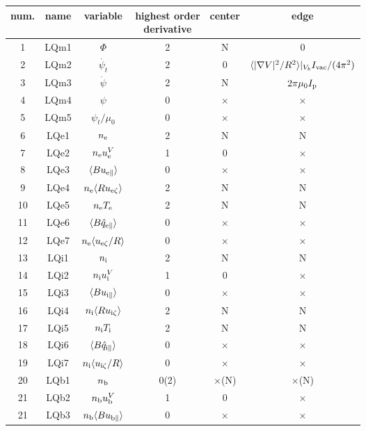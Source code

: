 \documentclass[11pt]{article}
\def\r#1{{\rm#1}}
\def\aves#1{\langle#1\rangle}
\def\para{\parallel}
\def\psid{\dot{\psi}}
\def\psit{\psi_t}
\def\psitd{\dot{\psit}}
\def\nee{n_\r{e}}
\def\ni{n_\r{i}}
\def\nb{n_\r{b}}
\def\Te{T_\r{e}}
\def\Ti{T_\r{i}}
\def\uezt{u_{\r{e}\zeta}}
\def\uizt{u_{\r{i}\zeta}}
\def\uepara{u_{\r{e}\para}}
\def\uipara{u_{\r{i}\para}}
\def\ubpara{u_{\r{b}\para}}
\def\qhatepara{\hat{q}_{\r{e}\para}}
\def\qhatipara{\hat{q}_{\r{i}\para}}
\def\ueV{u_\r{e}^V}
\def\uiV{u_\r{i}^V}
\def\ubV{u_\r{b}^V}
\begin{document}
%
\begin{tabular}{|c|c|c|c|c|c|}\hline
 num. & name & variable             & \shortstack{highest order\\ derivative} & center & edge \\\hline
 1    & LQm1 & $\Phi$               & 2    &  N        & 0\\
 2    & LQm2 & $\psitd$             & 2    &  0        & $\aves{|\nabla V|^2/R^2}|_{V_b}I_\r{vac}/(4\pi^2)$\\
 3    & LQm3 & $\psid$              & 2    &  N        & $2\pi\mu_0I_\r{p}$\\
 4    & LQm4 & $\psi$               & 0    &  $\times$ & $\times$\\
 5    & LQm5 & $\psit/\mu_0$        & 0    &  $\times$ & $\times$\\
 6    & LQe1 & $\nee$               & 2    &  N        & N\\
 7    & LQe2 & $\nee\ueV$           & 1    &  0        & $\times$\\
 8    & LQe3 & $\aves{B\uepara}$    & 0    &  $\times$ & $\times$\\
 9    & LQe4 & $\nee\aves{R\uezt}$  & 2    &  N        & N\\
 10   & LQe5 & $\nee \Te$           & 2    &  N        & N\\
 11   & LQe6 & $\aves{B\qhatepara}$ & 0    &  $\times$ & $\times$\\
 12   & LQe7 & $\nee\aves{\uezt/R}$ & 0    &  $\times$ & $\times$\\
 13   & LQi1 & $\ni$                & 2    &  N        & N\\
 14   & LQi2 & $\ni\uiV$            & 1    &  0        & $\times$\\
 15   & LQi3 & $\aves{B\uipara}$    & 0    &  $\times$ & $\times$\\
 16   & LQi4 & $\ni\aves{R\uizt}$   & 2    &  N        & N\\
 17   & LQi5 & $\ni \Ti$            & 2    &  N        & N\\
 18   & LQi6 & $\aves{B\qhatipara}$ & 0    &  $\times$ & $\times$\\
 19   & LQi7 & $\ni\aves{\uizt/R}$  & 0    &  $\times$ & $\times$\\
 20   & LQb1 & $\nb$                & 0(2) &  $\times$(N) & $\times$(N)\\
 21   & LQb2 & $\nb\ubV$            & 1    &  0        & $\times$\\
 21   & LQb3 & $\nb\aves{B\ubpara}$ & 0    &  $\times$ & $\times$\\

\end{tabular}
\end{document}
